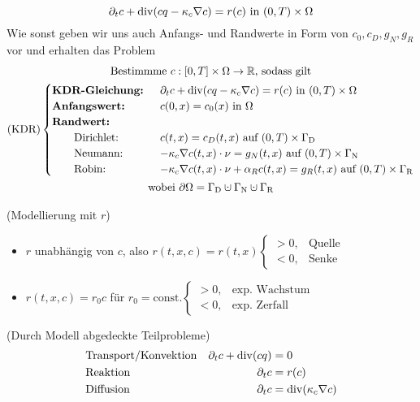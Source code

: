 \[ \partial_t c + \operatorname{div}(c q - \kappa_c \nabla c) = r(c) \text{ in } (0,T) \times \Omega \]
Wie sonst geben wir uns auch Anfangs- und Randwerte in Form von $ c_0, c_D, g_N, g_R $vor und erhalten das Problem
\begin{gather*}
	\text{Bestimmme } c:[0,T] \times \Omega \to \R \text{, sodass gilt}\\
	\KDR \begin{cases}
		\text{\textbf{KDR-Gleichung: }}&\partial_t c + \dive(c q - \kappa_c \nabla c) = r(c) \text{ in } (0,T) \times \Omega\\
		\text{\textbf{Anfangswert: }} &c(0,x) = c_0(x) \text{ in } \Omega\\
		\text{\textbf{Randwert:}}\\
		\qquad \text{Dirichlet: } &c(t,x) = c_D(t,x) \text{ auf } (0,T) \times \GammaD \\
		\qquad \text{Neumann: } &-\kappa_c \nabla c(t,x) \cdot \nu = g_N(t,x) \text{ auf } (0,T) \times \GammaN \\
		\qquad \text{Robin: } &-\kappa_c \nabla c(t,x) \cdot \nu + \alpha_R c(t,x) = g_R(t,x) \text{ auf } (0,T) \times \GammaR
	\end{cases}\\
	\text{wobei } \partial \Omega = \GammaD \cupdot \GammaN \cupdot \GammaR
\end{gather*}

\begin{remark}
	(Modellierung mit $ r $)
	\begin{itemize}
		\item $ r $ unabhängig von $ c $, also $ r(t,x,c) = r(t,x) \begin{cases}
		> 0, &\text{Quelle}\\
		< 0, &\text{Senke}
		\end{cases} $
		\item $ r(t,x,c) = r_0 c $ für $ r_0 = \text{const.} \begin{cases}
		> 0, &\text{exp. Wachstum}\\
		< 0, &\text{exp. Zerfall}
		\end{cases} $
	\end{itemize}
\end{remark}

\begin{remark}
	(Durch Modell abgedeckte Teilprobleme)
	\begin{align*}
	&\text{Transport/Konvektion} & \partial_t c + \operatorname{div}(cq) &= 0\\
	&\text{Reaktion} & \partial_t c &= r(c)\\
	&\text{Diffusion} & \partial_t c &= \operatorname{div}(\kappa_c \nabla c)
	\end{align*}
\end{remark}

